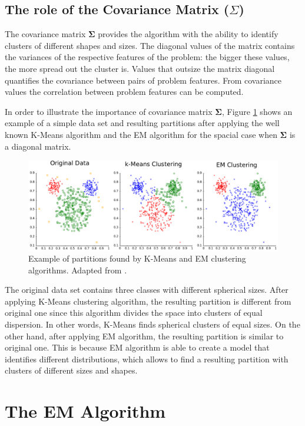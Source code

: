 \subsection{The role of the Covariance Matrix ($\Sigma$)}

The covariance matrix $\bm{\Sigma}$ provides the algorithm with the ability to identify clusters of different shapes and sizes. The diagonal values of the matrix contains the variances of the respective features of the problem: the bigger these values, the more spread out the cluster is. Values that outsize the matrix diagonal quantifies the covariance between pairs of problem features. From covariance values the correlation between problem features can be computed.

In order to illustrate the importance of covariance matrix $\bm{\Sigma}$, Figure \ref{example_partition} shows an example of a simple data set and resulting partitions after applying the well known K-Means algorithm and the EM algorithm for the spacial case when $\bm{\Sigma}$ is a diagonal matrix. 

\begin{figure}[ht]
\centering
\includegraphics[width=13cm]{figures/ClusterAnalysis_Mouse.png}
\caption{Example of partitions found by K-Means and EM clustering algorithms. Adapted from \cite{Chire}.}
\label{example_partition}
\end{figure}

The original data set contains three classes with different spherical sizes. After applying K-Means clustering algorithm, the resulting partition is different from original one since this algorithm divides the space into clusters of equal dispersion. In other words, K-Means finds spherical clusters of equal sizes. On the other hand, after applying EM algorithm, the resulting partition is similar to original one. This is because EM algorithm is able to create a model that identifies different distributions, which allows to find a resulting partition with clusters of different sizes and shapes.

\section{The EM Algorithm}
\label{sec:algorithm}

